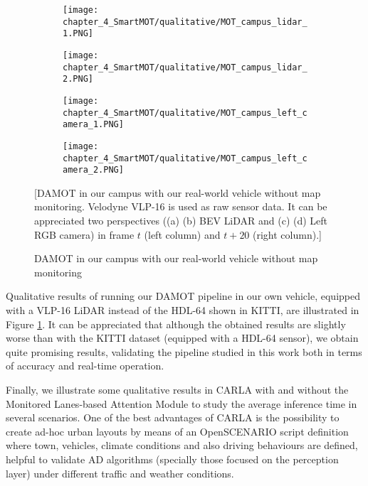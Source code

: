 \begin{figure}[h]
	\centering
	\begin{subfigure}{0.43\textwidth}
		\captionsetup{justification=centering}
		\texttt{[image: chapter\_4\_SmartMOT/qualitative/MOT\_campus\_lidar\_1.PNG]}
		\caption{}
	\end{subfigure}
	\hfill
	\begin{subfigure}{0.43\textwidth}
		\captionsetup{justification=centering}
		\texttt{[image: chapter\_4\_SmartMOT/qualitative/MOT\_campus\_lidar\_2.PNG]}
		\caption{}
	\end{subfigure}
	\hfill
	\begin{subfigure}{0.43\textwidth}
		\captionsetup{justification=centering}
		\texttt{[image: chapter\_4\_SmartMOT/qualitative/MOT\_campus\_left\_camera\_1.PNG]}
		\caption{}
	\end{subfigure}
	\hfill
	\begin{subfigure}{0.43\textwidth}
		\captionsetup{justification=centering}
		\texttt{[image: chapter\_4\_SmartMOT/qualitative/MOT\_campus\_left\_camera\_2.PNG]}
		\caption{}
	\end{subfigure}
	\captionsetup{justification=justified}
	\caption{\ac{DAMOT} in our campus with our real-world vehicle without map monitoring}[\ac{DAMOT} in our campus with our real-world vehicle without map monitoring. Velodyne VLP-16 is used as raw sensor data. It can be appreciated two perspectives ((a) (b) \ac{BEV} \ac{LiDAR} and (c) (d) Left RGB camera) in frame $t$ (left column) and $t+20$ (right column).]
	\label{fig:chapter_4_SmartMOT/MOT_campus}
\end{figure}

Qualitative results of running our \ac{DAMOT} pipeline in our own vehicle, equipped with a VLP-16 \ac{LiDAR} instead of the HDL-64 shown in KITTI, are illustrated in Figure \ref{fig:chapter_4_SmartMOT/MOT_campus}. It can be appreciated that although the obtained results are slightly worse than with the KITTI dataset (equipped with a HDL-64 sensor), we obtain quite promising results, validating the pipeline studied in this work both in terms of accuracy and real-time operation.

Finally, we illustrate some qualitative results in \ac{CARLA} with and without the Monitored Lanes-based Attention Module to study the average inference time in several scenarios. One of the best advantages of \ac{CARLA} is the possibility to create ad-hoc urban layouts by means of an OpenSCENARIO \cite{jullien2009openscenario} script definition where town, vehicles, climate conditions and also driving behaviours are defined, helpful to validate \ac{AD} algorithms (specially those focused on the perception layer) under different traffic and weather conditions. 

